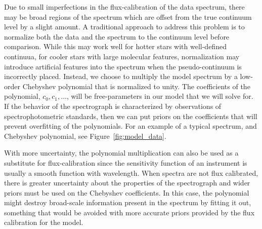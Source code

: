 \documentclass[iop,floatfix]{emulateapj}
\begin{document}
Due to small imperfections in the flux-calibration of the data spectrum, there
 may be broad regions of the spectrum which are offset from the true continuum
 level by a slight amount. 
A traditional approach to address this problem is to normalize both the data
 and the spectrum to the continuum level before comparison. 
While this may work well for hotter stars with well-defined continuua, for
 cooler stars with large molecular features, normalization may introduce
 artificial features into the spectrum when the pseudo-continuum is incorrectly
 placed. 
Instead, we choose to multiply the model spectrum by a low-order Chebyshev
 polynomial that is normalized to unity. 
The coefficients of the polynomial, $c_0, c_1, \ldots$, will be free-parameters
 in our model that we will solve for. 
If the behavior of the spectrograph is characterized by observations of
 spectrophotometric standards, then we can put priors on the coefficients that
 will prevent overfitting of the polynomials. 
For an example of a typical spectrum, and Chebyshev polynomial, see
 Figure~\ref{fig:model_data}.

With more uncertainty, the polynomial multiplication can also be used as a
 substitute for flux-calibration since the sensitivity function of an instrument
 is usually a smooth function with wavelength. 
When spectra are not flux calibrated, there is greater uncertainty about the
 properties of the spectrograph and wider priors must be used on the Chebyshev
 coefficients. 
In this case, the polynomial might destroy broad-scale information present in
 the spectrum by fitting it out, something that would be avoided with more
 accurate priors provided by the flux calibration for the model.
\end{document}
